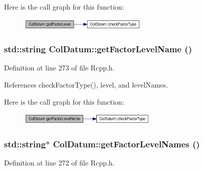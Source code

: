 Here is the call graph for this function:\nopagebreak
\begin{figure}[H]
\begin{center}
\leavevmode
\includegraphics[width=175pt]{classColDatum_df3716db9f3483f3cd255a4c05823479_cgraph}
\end{center}
\end{figure}
\hypertarget{classColDatum_012df5970083052c2348cbda9ed646bb}{
\subsubsection[{getFactorLevelName}]{\setlength{\rightskip}{0pt plus 5cm}std::string ColDatum::getFactorLevelName ()}}
\label{classColDatum_012df5970083052c2348cbda9ed646bb}




Definition at line 273 of file Rcpp.h.

References checkFactorType(), level, and levelNames.

Here is the call graph for this function:\nopagebreak
\begin{figure}[H]
\begin{center}
\leavevmode
\includegraphics[width=188pt]{classColDatum_012df5970083052c2348cbda9ed646bb_cgraph}
\end{center}
\end{figure}
\hypertarget{classColDatum_4376ad852efcf177fad6f168a8f44877}{
\subsubsection[{getFactorLevelNames}]{\setlength{\rightskip}{0pt plus 5cm}std::string$\ast$ ColDatum::getFactorLevelNames ()}}
\label{classColDatum_4376ad852efcf177fad6f168a8f44877}




Definition at line 272 of file Rcpp.h.

